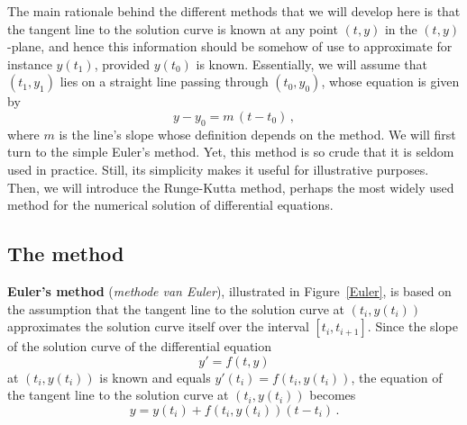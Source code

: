 The main rationale behind the  different methods that we will develop here is that the tangent line to the solution curve is known at any point $(t,y)$ in the $(t,y)$-plane, and hence this information should be somehow of use to approximate for instance $y(t_1)$, provided $y(t_0)$ is known. Essentially, we will assume that $(t_1,y_1)$  lies on a straight line passing through $(t_0,y_0)$, whose equation is given by
$$
y-y_0=m\,\left(t-t_0\right)\,,
$$
where $m$ is the line's slope whose definition depends on the method. We will first turn to the simple Euler's method. Yet, this method is so crude that it is seldom used in practice. Still, its simplicity makes it useful for illustrative purposes. Then, we will introduce the Runge-Kutta method, perhaps the most widely used method for the numerical solution of differential equations.

\subsection{The method}
\textbf{Euler's method} (\textit{methode van Euler}), illustrated in Figure~\ref{Euler}, is based on the assumption that the tangent line to the solution curve at $(t_i,y(t_i))$ approximates the solution curve itself over the interval $[t_i,t_{i+1}]$.  Since the slope of the solution curve of the differential equation
$$
y'=f(t,y)
$$
at $(t_i,y(t_i))$ is known and equals $y'(t_i)=f(t_i,y(t_i))$, the equation of the tangent line to the solution curve at $(t_i,y(t_i))$ becomes
\begin{equation} \label{eq:3.1.2}
y=y(t_i)+f(t_i,y(t_i))(t-t_i)\,.
\end{equation}


